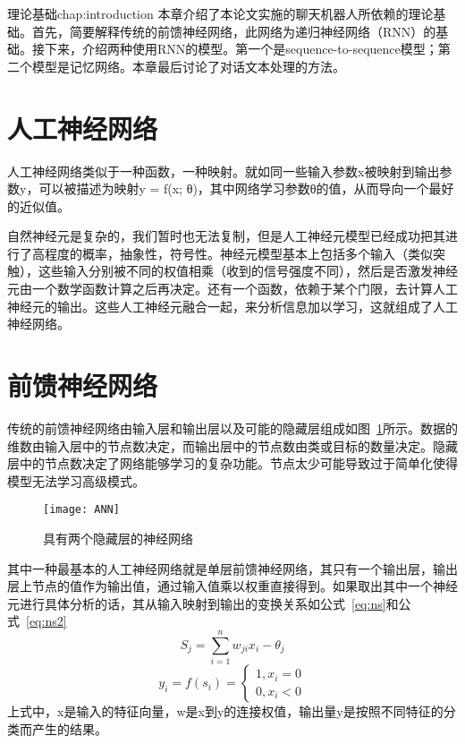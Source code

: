 \begin{cuzchapter}{理论基础}{chap:introduction}
本章介绍了本论文实施的聊天机器人所依赖的理论基础。首先，简要解释传统的前馈神经网络，此网络为递归神经网络（RNN）的基础。接下来，介绍两种使用RNN的模型。第一个是sequence-to-sequence模型；第二个模型是记忆网络。本章最后讨论了对话文本处理的方法。
\section{人工神经网络}\label{sec:background}
人工神经网络类似于一种函数，一种映射。就如同一些输入参数x被映射到输出参数y，可以被描述为映射y = f(x; θ)，其中网络学习参数θ的值，从而导向一个最好的近似值。

自然神经元是复杂的，我们暂时也无法复制，但是人工神经元模型已经成功把其进行了高程度的概率，抽象性，符号性。神经元模型基本上包括多个输入（类似突触），这些输入分别被不同的权值相乘（收到的信号强度不同），然后是否激发神经元由一个数学函数计算之后再决定。还有一个函数，依赖于某个门限，去计算人工神经元的输出。这些人工神经元融合一起，来分析信息加以学习，这就组成了人工神经网络。
\section{前馈神经网络}\label{sec:background}
传统的前馈神经网络由输入层和输出层以及可能的隐藏层组成如图~\ref{ANN}所示。数据的维数由输入层中的节点数决定，而输出层中的节点数由类或目标的数量决定。隐藏层中的节点数决定了网络能够学习的复杂功能。节点太少可能导致过于简单化使得模型无法学习高级模式。

\begin{figure}[!htbp]
    \centering
    \texttt{[image: ANN]}
    \caption[ANN]{具有两个隐藏层的神经网络}
    \label{ANN}
\end{figure}
\newpage
其中一种最基本的人工神经网络就是单层前馈神经网络，其只有一个输出层，输出层上节点的值作为输出值，通过输入值乘以权重直接得到。如果取出其中一个神经元进行具体分析的话，其从输入映射到输出的变换关系如公式~\ref{eq:ns}和公式~\ref{eq:ns2}
\begin{equation}
    \label{eq:ns}
        S_{j}=\sum ^{n}_{i=1}w_{ji}x_{i}-\theta _{j}
\end{equation}
\begin{equation}
    \label{eq:ns2}
    y_{i}=f\left( s_{i}\right) =\begin{cases}1,x_{i}=0\\
    0,x_{i} <0\end{cases}
\end{equation}
上式中，x是输入的特征向量，w是x到y的连接权值，输出量y是按照不同特征的分类而产生的结果。


\end{cuzchapter}
